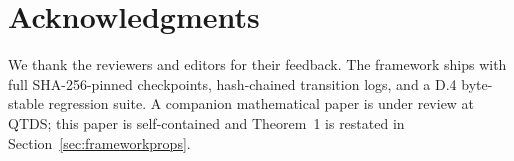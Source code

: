 \documentclass[journal,twocolumn,final]{IEEEtran}
\begin{document}
\section*{Acknowledgments}
We thank the reviewers and editors for their feedback. The framework ships
with full SHA-256-pinned checkpoints, hash-chained transition logs, and a D.4
byte-stable regression suite. A companion mathematical paper is under review at
QTDS; this paper is self-contained and Theorem~1 is restated in Section~\ref{sec:frameworkprops}.

\end{document}
